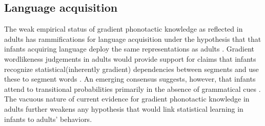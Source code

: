\subsection{Language acquisition}

The weak empirical status of gradient phonotactic knowledge as reflected in adults has rammifications for language acquisition under the hypothesis that that infants acquiring language deploy the same representations as adults \citep[e.g.,][]{Macnamara1982,Pinker1984,Crain1991,Carey1995,deVilliers2001,Legate2007}. Gradient wordlikeness judgements in adults would provide support for claims that infants recognize statistical(inherently gradient) dependencies between segments \citep{Jusczyk1994} and use these to segment words \citep{Saffran1996}. An emerging consensus suggests, however, that infants attend to transitional probabilities primarily in the absence of grammatical cues \citep{Gambell2005,Hohne1994,Johnson2001,Jusczyk1999c,Lignos2012,Mattys2001a,Shukla2007,Lew-Williams2012}. The vacuous nature of current evidence for gradient phonotactic knowledge in adults further weakens any hypothesis that would link statistical learning in infants to adults' behaviors.

